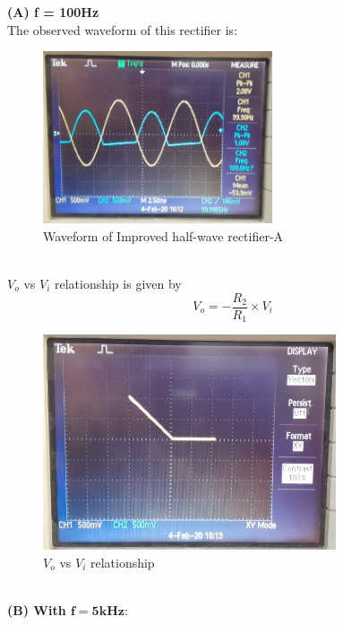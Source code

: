 \documentclass[12pt]{article}
\begin{document}
        \textbf{(A) f = 100Hz}\\
        
        The observed waveform of this rectifier is: 
        \begin{figure}[H]
            \centering
            \includegraphics[width = 0.5\linewidth, height = 2in]{reports/lab3/half-wave-rect-A-100k.jpeg}
            \caption{Waveform of Improved half-wave rectifier-A}
        \end{figure}
        \\
        $V_o$ vs $V_i$ relationship is given by
        \begin{equation}
            V_o = -\frac{R_2}{R_1}\times V_i
        \end{equation}
        \begin{figure}[H]
            \centering
            \includegraphics[width = 0.6\linewidth, height = 2.5in]{reports/lab3/half-wave-rect-A.jpeg}
            \caption{$V_o$ vs $V_i$ relationship}
        \end{figure}
        \\
        
        \textbf{(B) With $\mathbf{f = 5kHz :}$}\\
    
\end{document}
